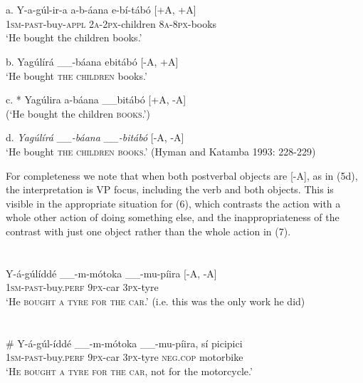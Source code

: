 \documentclass[output=paper]{langsci/langscibook}
\begin{document}
\chapter[  ]{  }
\gll a.  Y-a-gúl-ir-a      a-b-áana    e-bí-tábó  \textup{[+A, +A]}\\
       1\textsc{sm}{}-\textsc{past}{}-buy-\textsc{appl  }  \textsc{2a-2px}{}-children  \textsc{8a-8px}{}-books\\
\glt   ‘He bought the children books.’             
\z

\gll b.  Yagúlírá \_\_-báana ebitábó            \textup{[-A, +A]}\\
\glt   ‘He bought \textsc{the children} books.’           
\z

\gll c.  * Yagúlira a-báana \_\_bitábó            \textup{[+A, -A]}\\
\glt   (‘He bought the children \textsc{books}.’)           
\z

\glt d.  \textit{Yagúlírá \_\_-báana \_\_-bitábó}            [-A, -A]\\
  ‘He bought \textsc{the children books}.’ (Hyman and Katamba 1993: 228-229)
\z

For completeness we note that when both postverbal objects are [-A], as in (5d), the interpretation is VP focus, including the verb and both objects. This is visible in the appropriate situation for (6), which contrasts the action with a whole other action of doing something else, and the inappropriateness of the contrast with just one object rather than the whole action in (7).

\chapter[  ]{  }
\gll Y-á-gúlíddé    \_\_-m-mótoka    \_\_-mu-píira      \textup{[-A, -A]}\\
\glt \textsc{1sm-past}{}-buy.\textsc{perf}       \textsc{9px}{}-car              \textsc{3px}{}-tyre\\
‘He \textsc{bought a tyre for the car}.’ (i.e. this was the only work he did) 
\z

\chapter{}
\gll \# Y-á-gúl-íddé      \_\_-m-mótoka    \_\_-mu-píira,  sí    picipici\\
     \textsc{1sm-past}{}-buy.\textsc{perf    }   \textsc{9px}{}-car       \textsc{3px}{}-tyre   \textsc{neg}.\textsc{cop}  motorbike\\
\glt   ‘\textsc{He bought a tyre for the car}, not for the motorcycle.’
\z
\end{document}
